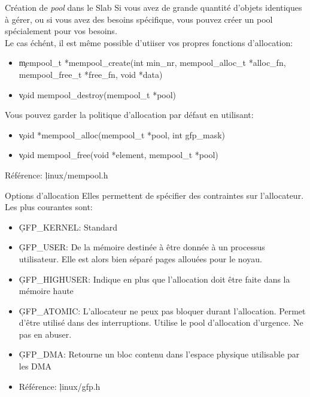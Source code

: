 \begin{frame}[fragile=singleslide]{Création de \emph{pool} dans le Slab}
  Si vous avez  de grande quantité d'objets identiques  à gérer, ou si
  vous avez des besoins spécifique, vous pouvez créer un pool
  spécialement pour vos besoins.\\[2ex]

  Le cas échént, il est  même possible d'utiiser vos propres fonctions
  d'allocation:
  \begin{itemize} 
  \item \c{mempool_t *mempool_create(int min_nr, mempool_alloc_t *alloc_fn, mempool_free_t *free_fn, void *data)}
  \item \c{void mempool_destroy(mempool_t *pool)}
  \end{itemize} 
  Vous pouvez garder la politique d'allocation par défaut en
  utilisant:
  \begin{itemize} 
  \item \c{void *mempool_alloc(mempool_t *pool, int gfp_mask)}
  \item \c{void mempool_free(void *element, mempool_t *pool)}
  \end{itemize} 
  Référence: \c{linux/mempool.h}
\end{frame}

\begin{frame}[fragile=singleslide]{Options d'allocation}
  Elles permettent de spécifier  des contraintes sur l'allocateur. Les
  plus courantes sont:
  \begin{itemize} 
  \item \c{GFP_KERNEL}: Standard
  \item  \c{GFP_USER}: De  la  mémoire  destinée à  être  donnée à  un
    processus utilisateur.  Elle est alors bien  séparé pages allouées
    pour le noyau.
  \item \c{GFP_HIGHUSER}:  Indique en plus que  l'allocation doit être
    faite dans la mémoire haute
  \item  \c{GFP_ATOMIC}:  L'allocateur  ne  peux  pas  bloquer  durant
    l'allocation.      Permet     d'être     utilisé      dans     des
    interruptions. Utilise  le pool d'allocation d'urgence.  Ne pas en
    abuser.
  \item \c{GFP_DMA}:  Retourne un bloc contenu  dans l'espace physique
    utilisable par les DMA
  \item Référence: \c{linux/gfp.h}
  \end{itemize} 
\end{frame} 

